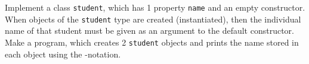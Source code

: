 \label{class:myFirstClass}
Implement a class \lstinline{student}, which has 1 property \lstinline{name} and an empty constructor. When objects of the \lstinline{student} type are created (instantiated), then the individual name of that student must be given as an argument to the default constructor. Make a program, which creates 2 \lstinline{student} objects and prints the name stored in each object using the -notation.